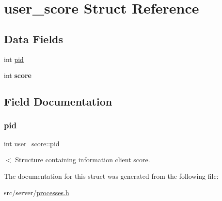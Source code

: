 \hypertarget{structuser__score}{}\section{user\+\_\+score Struct Reference}
\label{structuser__score}
\subsection*{Data Fields}
\begin{DoxyCompactItemize}
\item 
int \mbox{\hyperlink{structuser__score_a7661b7ca2eb7c591a38b1f002c002814}{pid}}
\item 
\mbox{\label{structuser__score_acd93ddcb7f65b702a4a80f28ade5049e}} 
int {\bfseries score}
\end{DoxyCompactItemize}


\subsection{Field Documentation}
\mbox{\label{structuser__score_a7661b7ca2eb7c591a38b1f002c002814}} 
\subsubsection{\texorpdfstring{pid}{pid}}
{\footnotesize\ttfamily int user\+\_\+score\+::pid}

$<$ Structure containing information client score. 

The documentation for this struct was generated from the following file\+:\begin{DoxyCompactItemize}
\item 
src/server/\mbox{\hyperlink{processes_8h}{processes.\+h}}\end{DoxyCompactItemize}
